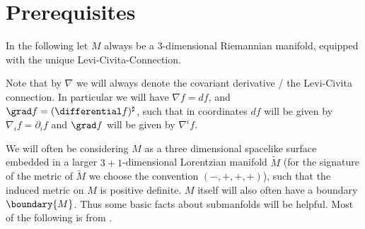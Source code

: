 \documentclass[titlepage,numbers=noenddot,headinclude,oneside,%
footinclude=true,cleardoublepage=empty,%
BCOR=5mm,paper=a4,fontsize=11pt,%
english,%
]{scrartcl}
\begin{document}
\section{Prerequisites}

In the following let \( M \) always be a 3-dimensional Riemannian manifold, equipped with the unique Levi-Civita-Connection.

Note that by \( \nabla \) we will always denote the covariant derivative / the Levi-Civita connection. In particular we will have \( \nabla f=df \), and \( \grad f=(\differential f)^\sharp \), such that in coordinates \( df \) will be given by \( \nabla_i f=\partial_i f \) and \( \grad f \) will be given by \( \nabla^i     f \).

We will often be considering \( M \) as a three dimensional spacelike surface embedded in a larger \( 3+1 \)-dimensional Lorentzian manifold \( \tilde{M} \) (for the signature of the metric of \( \tilde{M} \) we choose the convention \( (-,+,+,+) \)), such that the induced metric on \( M \) is positive definite. \( M \) itself will also often have a boundary \( \boundary{M} \). Thus some basic facts about submanfolds will be helpful. Most of the following is from \cite[Chapter~2.1]{leeGeometricRelativity2019}.
\end{document}
